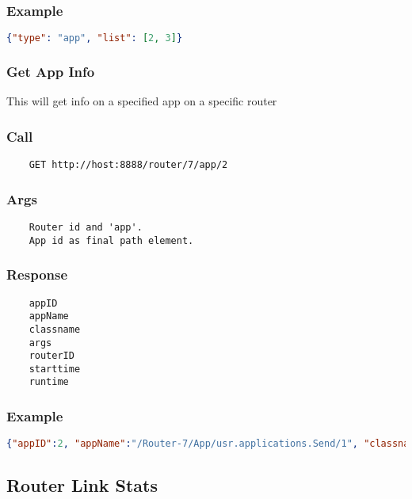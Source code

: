 \subsubsection*{Example}
\begin{lstlisting}[language=json]
{"type": "app", "list": [2, 3]}
\end{lstlisting}



\hr
\subsubsection{Get App Info}
This will get info on a specified app on a specific router
\subsubsection*{Call}
\begin{verbatim}
	GET http://host:8888/router/7/app/2
\end{verbatim}

\subsubsection*{Args}
\begin{verbatim}
	Router id and 'app'. 
	App id as final path element.
\end{verbatim}

\subsubsection*{Response}
\begin{verbatim}
	appID
	appName
	classname
	args
	routerID
	starttime
	runtime
\end{verbatim}

\subsubsection*{Example}
\begin{lstlisting}[language=json]
{"appID":2, "appName":"/Router-7/App/usr.applications.Send/1", "classname":"usr.applications.Send", "args":"[8, 4000, 2500000, -s, 1024]", "routerID":7, "starttime":1362090555686, "runtime": 42854}
\end{lstlisting}


\subsection{Router Link Stats}

